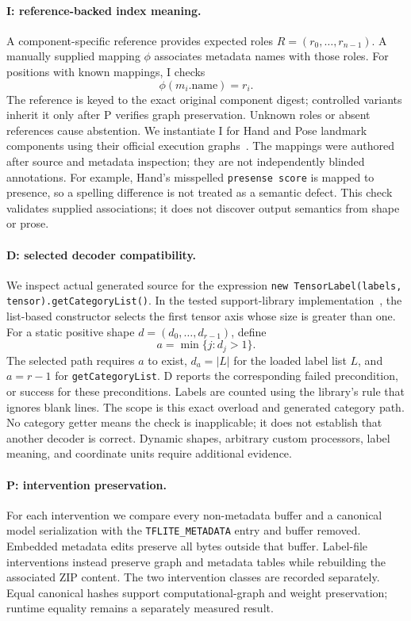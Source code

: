 \documentclass[10pt,twocolumn,letterpaper]{article}
\newcommand{\code}[1]{\texttt{#1}}
\begin{document}
\paragraph{I: reference-backed index meaning.}
A component-specific reference provides expected roles $R=(r_0,\ldots,r_{n-1})$. A manually supplied mapping $\phi$ associates metadata names with those roles. For positions with known mappings, I checks
\begin{equation}
\phi(m_i.\mathrm{name})=r_i.
\end{equation}
The reference is keyed to the exact original component digest; controlled variants inherit it only after P verifies graph preservation. Unknown roles or absent references cause abstention. We instantiate I for Hand and Pose landmark components using their official execution graphs~\cite{hand-graph,pose-graph}. The mappings were authored after source and metadata inspection; they are not independently blinded annotations. For example, Hand's misspelled \code{presense score} is mapped to presence, so a spelling difference is not treated as a semantic defect. This check validates supplied associations; it does not discover output semantics from shape or prose.

\paragraph{D: selected decoder compatibility.}
We inspect actual generated source for the expression \code{new TensorLabel(labels, tensor).getCategoryList()}. In the tested support-library implementation~\cite{tensorlabel}, the list-based constructor selects the first tensor axis whose size is greater than one. For a static positive shape $d=(d_0,\ldots,d_{r-1})$, define
\begin{equation}
a=\min\{j:d_j>1\}.
\end{equation}
The selected path requires $a$ to exist, $d_a=|L|$ for the loaded label list $L$, and $a=r-1$ for \code{getCategoryList}. D reports the corresponding failed precondition, or success for these preconditions. Labels are counted using the library's rule that ignores blank lines. The scope is this exact overload and generated category path. No category getter means the check is inapplicable; it does not establish that another decoder is correct. Dynamic shapes, arbitrary custom processors, label meaning, and coordinate units require additional evidence.

\paragraph{P: intervention preservation.}
For each intervention we compare every non-metadata buffer and a canonical model serialization with the \code{TFLITE\_METADATA} entry and buffer removed. Embedded metadata edits preserve all bytes outside that buffer. Label-file interventions instead preserve graph and metadata tables while rebuilding the associated ZIP content. The two intervention classes are recorded separately. Equal canonical hashes support computational-graph and weight preservation; runtime equality remains a separately measured result.
\end{document}
